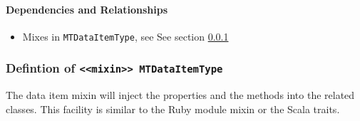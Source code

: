 \paragraph{Dependencies and Relationships}
\begin{itemize}
\item Mixes in \texttt{MTDataItemType}, see See section \ref{type:MTDataItemType}
\end{itemize}
\FloatBarrier
\subsubsection{Defintion of \texttt{<<mixin>> MTDataItemType}}
  \label{type:MTDataItemType}

\FloatBarrier

The data item mixin will inject the properties and the methods into the related 
classes. This facility is similar to the Ruby module mixin or the Scala traits.

